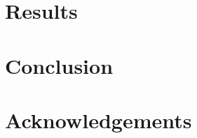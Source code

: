 \documentclass[letterpaper,twocolumn,10pt]{article}
\begin{document}

\section{Results} \label{Results}


\section{Conclusion} \label{Conclusion}


\section{Acknowledgements} \label{Acknowledgements}





\end{document}
